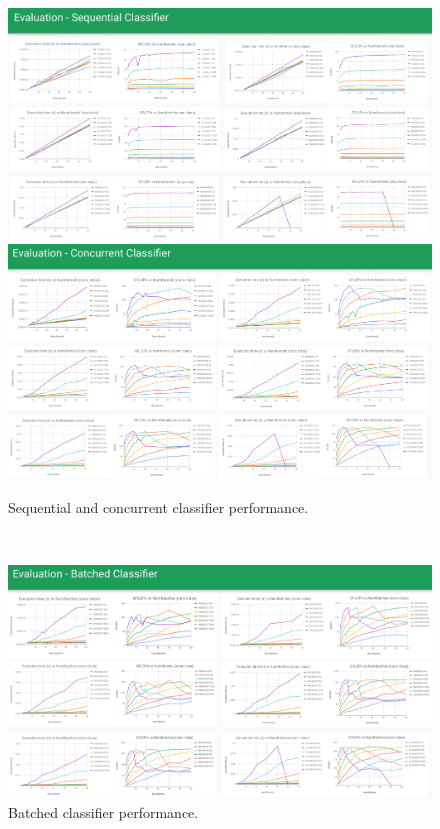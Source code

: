 \documentclass[sigconf]{acmart}
\begin{document}
\newpage~\newpage
\begin{figure}[htb]
  \centering
  \includegraphics[width=\textwidth]{img/seq-class}
  \includegraphics[width=\textwidth]{img/conc-class}
  \caption{Sequential and concurrent classifier performance.}
\end{figure}

\newpage~\newpage
\begin{figure}[htb]
  \centering
  \includegraphics[width=\textwidth]{img/batch-class}
  \caption{Batched classifier performance.}
\end{figure}
\end{document}
